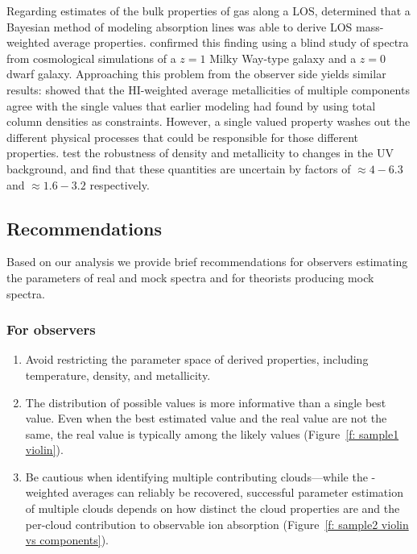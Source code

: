 \documentclass[fleqn,usenatbib]{mnras}
\begin{document}
Regarding estimates of the bulk properties of gas along a LOS,
\cite{liang2018Observing} determined that a Bayesian method of modeling absorption lines was able to derive LOS  mass-weighted average properties.
\cite{marra2021.cosmo.sims.test.observational.modeling} confirmed this finding using a blind study of spectra from cosmological simulations of a $z=1$ Milky Way-type galaxy and a $z=0$ dwarf galaxy.
Approaching this problem from the observer side yields similar results:
\cite{sameer2021Cloudbycloud} showed that the HI-weighted average metallicities of multiple components agree with the single values that earlier modeling had found by using total column densities as constraints.
However, a single valued property washes out the different physical processes that could be responsible for those different properties.
\cite{acharya2021How} test the robustness of density and metallicity to changes in the UV background, and find that these quantities are uncertain by factors of $\approx 4-6.3$ and $\approx 1.6-3.2$ respectively.

\subsection{Recommendations}

Based on our analysis we provide brief recommendations for observers estimating the parameters of real and mock spectra and for theorists producing mock spectra.

\subsubsection{For observers}

\begin{enumerate}
    \item Avoid restricting the parameter space of derived properties, including temperature, density, and metallicity. 
    \item The distribution of possible values is more informative than a single best value. Even when the best estimated value and the real value are not the same, the real value is typically among the likely values (Figure~\ref{f: sample1 violin}).
    \item Be cautious when identifying multiple contributing clouds---while the -weighted averages can reliably be recovered, successful parameter estimation of multiple clouds depends on how distinct the cloud properties are and the per-cloud contribution to observable ion absorption (Figure~\ref{f: sample2 violin vs components}).
\end{enumerate}
\end{document}
